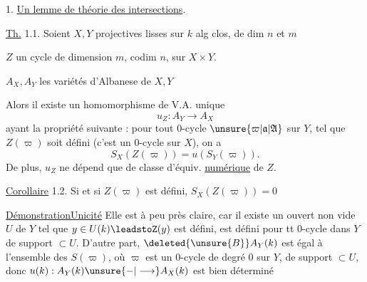 1. \uline{Un lemme de théorie des intersections}.

\uline{Th.} 1.1. Soient $X,Y$ projectives  lisses  sur $k$ alg clos, de dim $n$ et $m$

$Z$ un cycle de dimension $m$, codim $n$, sur $X\times Y$.

$A_X,A_Y$ les variétés d'Albanese  de $X,Y$

Alors il existe un homomorphisme de V.A. unique
\[
u_Z:A_Y\longrightarrow A_X
\]
ayant la propriété suivante : pour tout $0$-cycle $\unsure{\varpi|\mathfrak{a}|\mathfrak{A}}$ sur $Y$,  tel que $Z(\varpi)$ soit défini (c'est  un $0$-cycle sur $X$), on a
\[
S_X(Z(\varpi))=u(S_Y(\varpi)).
\]
De plus, $u_Z$ ne dépend que de classe d'équiv. \uline{numérique} de $Z$.

\uline{Corollaire} 1.2. Si  et si $Z(\varpi)$ est défini,  $S_X(Z(\varpi))=0$ 

\uline{Démonstration}\qquad \uline{Unicité} Elle est à peu près claire, car il existe un ouvert non vide $U$ de $Y$ tel que $y\in U(k)\leadstoZ(y)$ est défini,  est défini pour tt $0$-cycle dans $Y$ de support $\subset U$. D'autre part, $\deleted{\unsure{B}}A_Y(k)$ est égal à l'ensemble des $S(\varpi)$, où $\varpi$ est un  $0$-cycle de degré $0$ sur $Y$, de support $\subset U$, donc $u(k):A_Y(k)\unsure{-|\longrightarrow}A_X(k)$ est bien déterminé
